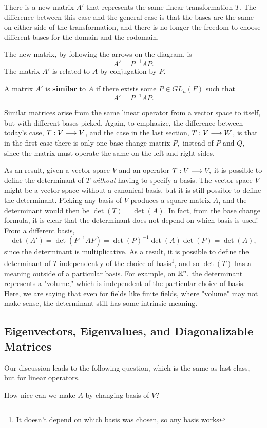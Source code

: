 There is a new matrix $A'$ that represents the same linear transformation $T.$ The difference between this case and the general case is that the bases are the same on either side of the transformation, and there is no longer the freedom to choose different bases for the domain and the codomain. 

The new matrix, by following the arrows on the diagram, is \[A' = P^{-1}AP.\] The matrix $A'$ is related to $A$ by conjugation by $P.$ 

\begin{definition}
A matrix $A'$ is \textbf{similar} to $A$ if there exists some $P \in GL_n(F)$ such that \[A' = P^{-1}AP.\]
\end{definition}
Similar matrices arise from the same linear operator from a vector space to itself, but with different bases picked. Again, to emphasize, the difference between today's case, $T: V \longrightarrow V$, and the case in the last section, $T: V \longrightarrow W$, is that in the first case there is only one base change matrix $P,$ instead of $P$ and $Q,$ since the matrix must operate the same on the left and right sides.


As an result, given a vector space $V$ and an operator $T: V \longrightarrow V,$ it is possible to define the determinant of $T$ \emph{without} having to specify a basis. The vector space $V$ might be a vector space without a canonical basis, but it is still possible to define the determinant. Picking any basis of $V$ produces a square matrix $A$, and the determinant would then be $\det(T) = \det(A).$ In fact, from the base change formula, it is clear that the determinant does not depend on which basis is used! From a different basis, \[\det(A') = \det(P^{-1}AP) = \det(P)^{-1}\det(A)\det(P) = \det(A),\] since the determinant is multiplicative. As a result, it is possible to define the determinant of $T$ independently of the choice of basis\footnote{It doesn't depend on which basis was chosen, so any basis works}, and so $\det(T)$ has a meaning outside of a particular basis. For example, on $\mathbb R^n,$ the determinant represents a "volume," which is independent of the particular choice of basis. Here, we are saying that even for fields like finite fields, where "volume" may not make sense, the determinant still has some intrinsic meaning.

\subsection{Eigenvectors, Eigenvalues, and Diagonalizable Matrices}
Our discussion leads to the following question, which is the same as last class, but for linear operators.
\begin{qq}
How nice can we make $A$ by changing basis of $V$?
\end{qq}

